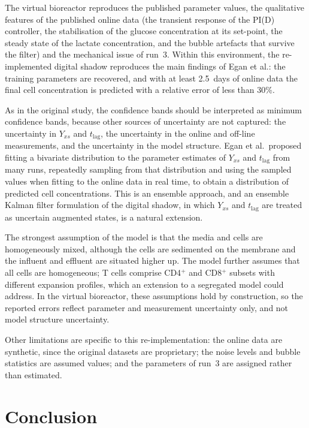 \documentclass[11pt,a4paper]{article}
\newcommand{\tlag}{t_{\mathrm{lag}}}
\begin{document}
The virtual bioreactor reproduces the published parameter values, the qualitative features of the
published online data (the transient response of the PI(D) controller, the stabilisation of the
glucose concentration at its set-point, the steady state of the lactate concentration, and the bubble
artefacts that survive the filter) and the mechanical issue of run~3. Within this environment, the
re-implemented digital shadow reproduces the main findings of Egan et al.: the training parameters are
recovered, and with at least 2.5~days of online data the final cell concentration is predicted with a
relative error of less than 30\%.

As in the original study, the confidence bands should be interpreted as minimum confidence bands,
because other sources of uncertainty are not captured: the uncertainty in $Y_{xs}$ and $\tlag$, the
uncertainty in the online and off-line measurements, and the uncertainty in the model structure.
Egan et al.\ proposed fitting a bivariate distribution to the parameter estimates of $Y_{xs}$ and
$\tlag$ from many runs, repeatedly sampling from that distribution and using the sampled values when
fitting to the online data in real time, to obtain a distribution of predicted cell concentrations.
This is an ensemble approach, and an ensemble Kalman filter formulation of the digital shadow, in
which $Y_{xs}$ and $\tlag$ are treated as uncertain augmented states, is a natural extension.

The strongest assumption of the model is that the media and cells are homogeneously mixed, although
the cells are sedimented on the membrane and the influent and effluent are situated higher up. The
model further assumes that all cells are homogeneous; T cells comprise CD4$^+$ and CD8$^+$ subsets
with different expansion profiles, which an extension to a segregated model could address. In the
virtual bioreactor, these assumptions hold by construction, so the reported errors reflect parameter
and measurement uncertainty only, and not model structure uncertainty.

Other limitations are specific to this re-implementation: the online data are synthetic, since the
original datasets are proprietary; the noise levels and bubble statistics are assumed values; and the
parameters of run~3 are assigned rather than estimated.

\section{Conclusion}
\end{document}
